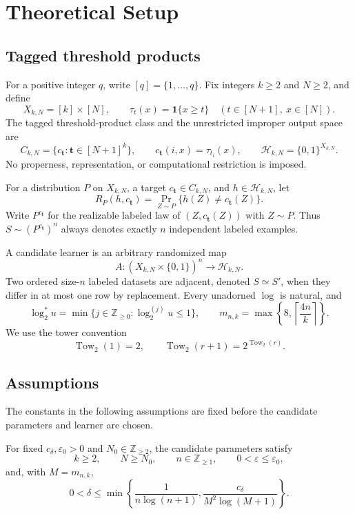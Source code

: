 \section{Theoretical Setup}\label{sec:setup}

\subsection{Tagged threshold products}

For a positive integer $q$, write $[q]=\{1,\ldots,q\}$.  Fix integers
$k\ge2$ and $N\ge2$, and define
\[
X_{k,N}=[k]\times[N],
\qquad
\tau_t(x)=\mathbf 1\{x\ge t\}
\quad(t\in[N+1],\ x\in[N]).
\]
The tagged threshold-product class and the unrestricted improper output space
are
\[
C_{k,N}=\{c_{\boldsymbol t}:\boldsymbol t\in[N+1]^k\},
\qquad
c_{\boldsymbol t}(i,x)=\tau_{t_i}(x),
\qquad
\mathcal H_{k,N}=\{0,1\}^{X_{k,N}}.
\]
No properness, representation, or computational restriction is imposed.

For a distribution $P$ on $X_{k,N}$, a target
$c_{\boldsymbol t}\in C_{k,N}$, and $h\in\mathcal H_{k,N}$, let
\[
R_P(h,c_{\boldsymbol t})
=\Pr_{Z\sim P}\{h(Z)\ne c_{\boldsymbol t}(Z)\}.
\]
Write $P^{c_{\boldsymbol t}}$ for the realizable labeled law of
$(Z,c_{\boldsymbol t}(Z))$ with $Z\sim P$.  Thus
$S\sim(P^{c_{\boldsymbol t}})^n$ always denotes exactly $n$ independent
labeled examples.

A candidate learner is an arbitrary randomized map
\[
A:(X_{k,N}\times\{0,1\})^n\longrightarrow\mathcal H_{k,N}.
\]
Two ordered size-$n$ labeled datasets are adjacent, denoted $S\simeq S'$,
when they differ in at most one row by replacement.  Every unadorned $\log$
is natural, and
\[
\log_2^*u
=\min\{j\in\mathbb Z_{\ge0}:\log_2^{(j)}u\le1\},
\qquad
m_{n,k}=\max\left\{8,\left\lceil\frac{4n}{k}\right\rceil\right\}.
\]
We use the tower convention
\[
\operatorname{Tow}_2(1)=2,
\qquad
\operatorname{Tow}_2(r+1)=2^{\operatorname{Tow}_2(r)}.
\]

\subsection{Assumptions}

The constants in the following assumptions are fixed before the candidate
parameters and learner are chosen.

\begin{assumption}\label{assump:candidate-regime}
For fixed $c_\delta,\varepsilon_0>0$ and $N_0\in\mathbb Z_{\ge2}$, the
candidate parameters satisfy
\[
k\ge2,
\qquad N\ge N_0,
\qquad n\in\mathbb Z_{\ge1},
\qquad 0<\varepsilon\le\varepsilon_0,
\]
and, with $M=m_{n,k}$,
\[
0<\delta\le
\min\left\{
\frac{1}{n\log(n+1)},
\frac{c_\delta}{M^2\log(M+1)}
\right\}.
\]
\end{assumption}


